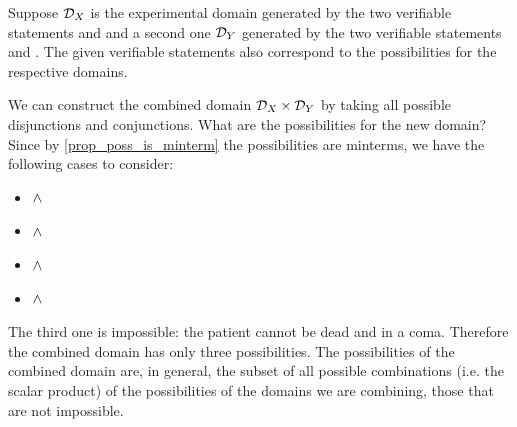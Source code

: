 \documentclass[11pt,letterpaper,fleqn]{memoir} %
\begin{document}
Suppose $\mathcal{D}_X$ is the experimental domain generated by the two verifiable statements  and  and a second one $\mathcal{D}_Y$ generated by the two verifiable statements  and . The given verifiable statements also correspond to the possibilities for the respective domains.

We can construct the combined domain $\mathcal{D}_X \times \mathcal{D}_Y$ by taking all possible disjunctions and conjunctions. What are the possibilities for the new domain? Since by \ref{prop_poss_is_minterm} the possibilities are minterms, we have the following cases to consider:
\begin{itemize}
	\item {} $\wedge$ 
	\item {} $\wedge$ 
	\item {} $\wedge$ 
	\item {} $\wedge$ 
\end{itemize}
The third one is impossible: the patient cannot be dead and in a coma. Therefore the combined domain has only three possibilities. The possibilities of the combined domain are, in general, the subset of all possible combinations (i.e. the scalar product) of the possibilities of the domains we are combining, those that are not impossible.
\end{document}
